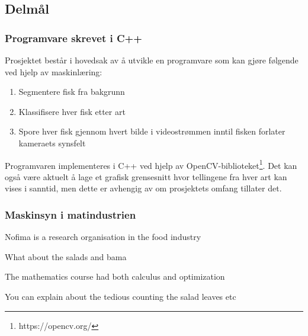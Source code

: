 \subsection{Delmål}

\subsubsection{Programvare skrevet i C++}

Prosjektet består i hovedsak av å utvikle en programvare som kan gjøre følgende ved hjelp av maskinlæring: 

\begin{enumerate}
\item Segmentere fisk fra bakgrunn
\item Klassifisere hver fisk etter art
\item Spore hver fisk gjennom hvert bilde i videostrømmen inntil fisken forlater kameraets synsfelt
\end{enumerate}

Programvaren implementeres i C++ ved hjelp av OpenCV-biblioteket\footnote{https://opencv.org/}. Det kan også være aktuelt å lage et grafisk grensesnitt hvor tellingene fra hver art kan vises i sanntid, men dette er avhengig av om prosjektets omfang tillater det. 



\subsubsection{Maskinsyn i matindustrien}

Nofima is a research organisation in the food industry

What about the salads and bama

The mathematics course had both calculus and optimization

You can explain about the tedious counting the salad leaves etc

